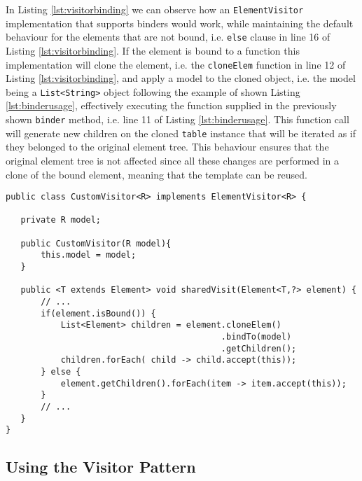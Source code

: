 \noindent
In Listing \ref{lst:visitorbinding} we can observe how an \texttt{ElementVisitor} implementation that supports binders would work, while maintaining the default behaviour for the elements that are not bound, i.e. \texttt{else} clause in line 16 of Listing \ref{lst:visitorbinding}. If the element is bound to a function this implementation will clone the element, i.e. the \texttt{cloneElem} function in line 12 of Listing \ref{lst:visitorbinding}, and apply a model to the cloned object, i.e. the model being a \texttt{List<String>} object following the example of shown Listing \ref{lst:binderusage}, effectively executing the function supplied in the previously shown \texttt{binder} method, i.e. line 11 of Listing \ref{lst:binderusage}. This function call will generate new children on the cloned \texttt{table} instance that will be iterated as if they belonged to the original element tree. This behaviour ensures that the original element tree is not affected since all these changes are performed in a clone of the bound element, meaning that the template can be reused.

\bigskip


\begin{minipage}{\linewidth}
\begin{lstlisting}[caption={Visitor with Binding Support},label={lst:visitorbinding}]
public class CustomVisitor<R> implements ElementVisitor<R> {

   private R model;

   public CustomVisitor(R model){
       this.model = model;
   }
    
   public <T extends Element> void sharedVisit(Element<T,?> element) {
       // ...
       if(element.isBound()) {
           List<Element> children = element.cloneElem()
                                           .bindTo(model)
                                           .getChildren();
           children.forEach( child -> child.accept(this));
       } else {
           element.getChildren().forEach(item -> item.accept(this));
       }
       // ...
   }
}
\end{lstlisting}
\end{minipage}
        
\subsection{Using the Visitor Pattern}
\label{sec:xsdasmvisitor}

